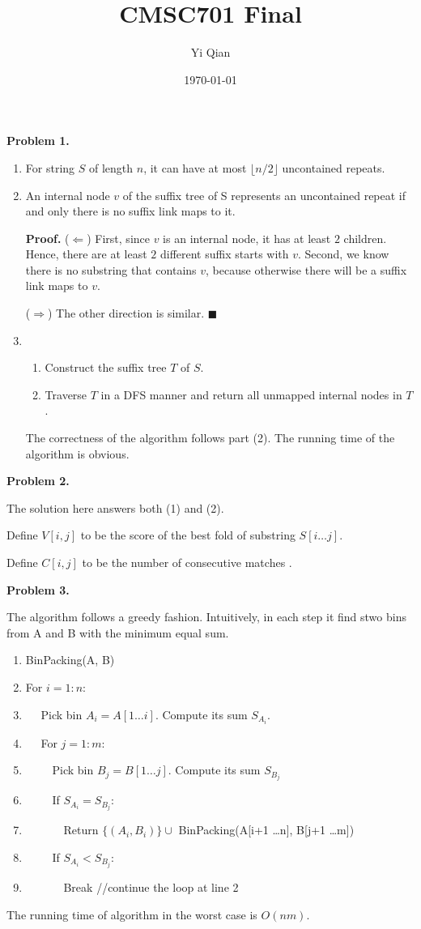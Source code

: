 \documentclass[11pt]{article}
\title{CMSC701 Final}
\author{Yi Qian}
\date{\today}
\begin{document}
\maketitle
{\bf Problem 1.} 
\begin{enumerate}
\item For string $S$ of length $n$, it can have at most $\lfloor n/2 \rfloor$ uncontained repeats.
\item An internal node $v$ of the suffix tree of S represents an uncontained repeat if and only there is no suffix link maps to it. 

{\bf Proof.} ($\Leftarrow$) First, since $v$ is an internal node, it has at least $2$ children. Hence, there are at least $2$ different suffix starts with $v$. Second, we know there is no substring that contains $v$, because otherwise there will be a suffix link maps to $v$.

($\Rightarrow$) The other direction is similar. $\blacksquare$
\item 
\begin{enumerate}
\item Construct the suffix tree $T$ of $S$.
\item Traverse $T$ in a DFS manner and return all unmapped internal nodes in $T$.
\end{enumerate}
The correctness of the algorithm follows part (2). The running time of the algorithm is obvious.
\end{enumerate}

{\bf Problem 2.}

The solution here answers both (1) and (2).

Define $V[i,j]$ to be the score of the best fold of substring $S[i \dots j]$.

Define $C[i,j]$ to be the number of consecutive matches .

{\bf Problem 3.}

The algorithm follows a greedy fashion. Intuitively, in each step it find stwo bins from A and B with the minimum equal sum.
\begin{enumerate}
\item BinPacking(A, B)
\item For $i = 1: n$:
\item $\quad$ Pick bin $A_{i}=A[1 \dots i]$. Compute its sum $S_{A_{i}}$.
\item $\quad$ For $j=1 : m$:
\item $\quad \quad$ Pick bin $B_{j}=B[1 \dots j]$. Compute its sum $S_{B_{j}}$
\item $\quad \quad$ If $S_{A_{i}} = S_{B_{j}}$: 
\item $\quad \quad \quad$ Return $\{(A_{i}, B_{i})\} \cup $ BinPacking(A[i+1 \dots n], B[j+1 \dots m])
\item $\quad \quad$ If $S_{A_{i}} < S_{B_{j}}: $ 
\item $\quad \quad \quad$ Break  //continue the loop at line 2 
\end{enumerate}
The running time of algorithm in the worst case is $O(nm)$. 
\end{document}
